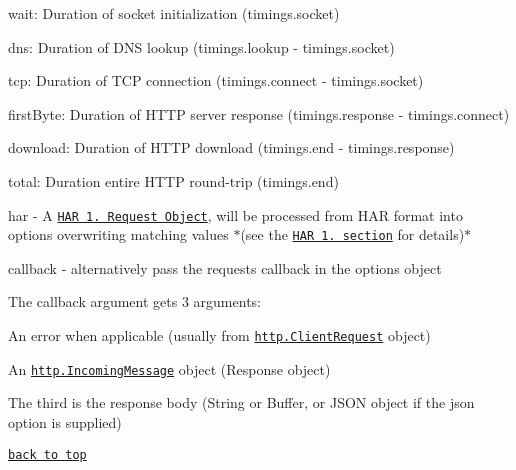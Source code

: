 \begin{DoxyItemize}
\begin{DoxyItemize}
\begin{DoxyItemize}
\item {\ttfamily wait}\+: Duration of socket initialization ({\ttfamily timings.\+socket})
\item {\ttfamily dns}\+: Duration of D\+NS lookup ({\ttfamily timings.\+lookup} -\/ {\ttfamily timings.\+socket})
\item {\ttfamily tcp}\+: Duration of T\+CP connection ({\ttfamily timings.\+connect} -\/ {\ttfamily timings.\+socket})
\item {\ttfamily first\+Byte}\+: Duration of H\+T\+TP server response ({\ttfamily timings.\+response} -\/ {\ttfamily timings.\+connect})
\item {\ttfamily download}\+: Duration of H\+T\+TP download ({\ttfamily timings.\+end} -\/ {\ttfamily timings.\+response})
\item {\ttfamily total}\+: Duration entire H\+T\+TP round-\/trip ({\ttfamily timings.\+end})
\end{DoxyItemize}
\end{DoxyItemize}
\item {\ttfamily har} -\/ A \href{http://www.softwareishard.com/blog/har-12-spec/#request}{\tt H\+AR 1. Request Object}, will be processed from H\+AR format into options overwriting matching values $\ast$(see the \href{#support-for-har-1.2}{\tt H\+AR 1. section} for details)$\ast$
\item {\ttfamily callback} -\/ alternatively pass the request\textquotesingle{}s callback in the options object
\end{DoxyItemize}

The callback argument gets 3 arguments\+:


\begin{DoxyEnumerate}
\item An {\ttfamily error} when applicable (usually from \href{http://nodejs.org/api/http.html#http_class_http_clientrequest}{\tt {\ttfamily http.\+Client\+Request}} object)
\item An \href{https://nodejs.org/api/http.html#http_class_http_incomingmessage}{\tt {\ttfamily http.\+Incoming\+Message}} object (Response object)
\item The third is the {\ttfamily response} body ({\ttfamily String} or {\ttfamily Buffer}, or J\+S\+ON object if the {\ttfamily json} option is supplied)
\end{DoxyEnumerate}

\href{#table-of-contents}{\tt back to top}





